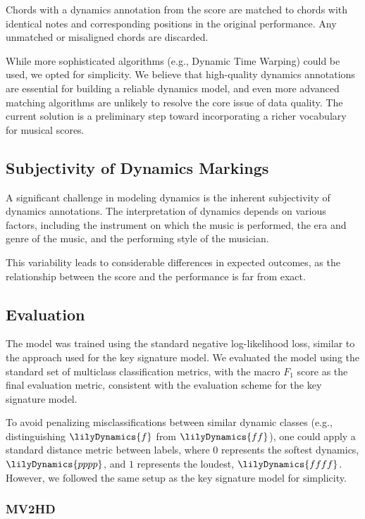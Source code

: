 Chords with a dynamics annotation from the score are matched to chords with identical notes and corresponding positions in the original performance. Any unmatched or misaligned chords are discarded.

While more sophisticated algorithms (e.g., Dynamic Time Warping) could be used, we opted for simplicity. We believe that high-quality dynamics annotations are essential for building a reliable dynamics model, and even more advanced matching algorithms are unlikely to resolve the core issue of data quality. The current solution is a preliminary step toward incorporating a richer vocabulary for musical scores.

\subsection{Subjectivity of Dynamics Markings}

A significant challenge in modeling dynamics is the inherent subjectivity of dynamics annotations. The interpretation of dynamics depends on various factors, including the instrument on which the music is performed, the era and genre of the music, and the performing style of the musician.

This variability leads to considerable differences in expected outcomes, as the relationship between the score and the performance is far from exact.

\subsection{Evaluation}

The model was trained using the standard negative log-likelihood loss, similar to the approach used for the key signature model. We evaluated the model using the standard set of multiclass classification metrics, with the macro $F_1$ score as the final evaluation metric, consistent with the evaluation scheme for the key signature model.

To avoid penalizing misclassifications between similar dynamic classes (e.g., distinguishing $\lilyDynamics{f}$ from $\lilyDynamics{ff}$), one could apply a standard distance metric between labels, where $0$ represents the softest dynamics, $\lilyDynamics{pppp}$, and $1$ represents the loudest, $\lilyDynamics{ffff}$. However, we followed the same setup as the key signature model for simplicity.

\subsubsection{MV2HD}

